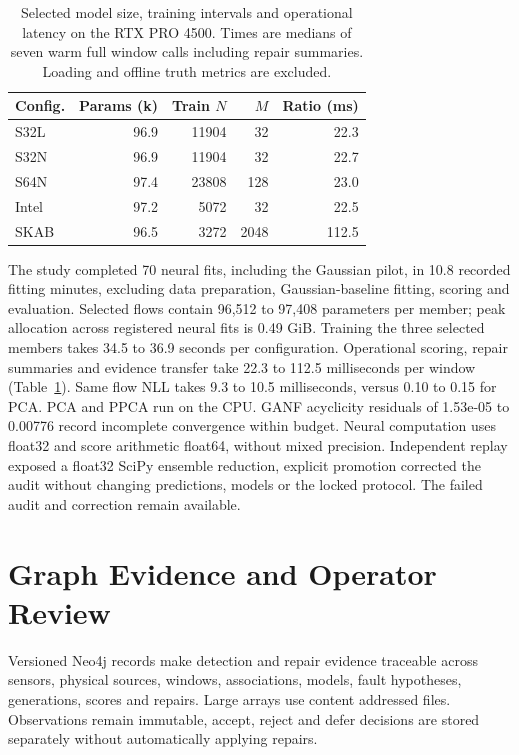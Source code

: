 \documentclass[conference]{IEEEtran}
\newcommand{\1}{\mathbf{1}}
\begin{document}
\begin{table}[t]
\centering
\caption{Selected model size, training intervals and operational latency on the RTX PRO 4500. Times are medians of seven warm full window calls including repair summaries. Loading and offline truth metrics are excluded.}
\label{tab:runtime}
\small
\begin{tabular}{lrrrr}
\toprule
Config. & Params (k) & Train $N$ & $M$ & Ratio (ms) \\
\midrule
S32L & 96.9 & 11904 & 32 & 22.3 \\
S32N & 96.9 & 11904 & 32 & 22.7 \\
S64N & 97.4 & 23808 & 128 & 23.0 \\
Intel & 97.2 & 5072 & 32 & 22.5 \\
SKAB & 96.5 & 3272 & 2048 & 112.5 \\
\bottomrule
\end{tabular}
\end{table}
The study completed 70 neural fits, including the Gaussian pilot, in 10.8 recorded fitting minutes, excluding data preparation, Gaussian-baseline fitting, scoring and evaluation. Selected flows contain 96,512 to 97,408 parameters per member; peak allocation across registered neural fits is 0.49 GiB. Training the three selected members takes 34.5 to 36.9 seconds per configuration. Operational scoring, repair summaries and evidence transfer take 22.3 to 112.5 milliseconds per window (Table~\ref{tab:runtime}). Same flow NLL takes 9.3 to 10.5 milliseconds, versus 0.10 to 0.15 for PCA. PCA and PPCA run on the CPU. GANF acyclicity residuals of 1.53e-05 to 0.00776 record incomplete convergence within budget. Neural computation uses float32 and score arithmetic float64, without mixed precision. Independent replay exposed a float32 SciPy ensemble reduction, explicit promotion corrected the audit without changing predictions, models or the locked protocol. The failed audit and correction remain available.



\section{Graph Evidence and Operator Review}
Versioned Neo4j records make detection and repair evidence traceable across sensors, physical sources, windows, associations, models, fault hypotheses, generations, scores and repairs. Large arrays use content addressed files. Observations remain immutable, accept, reject and defer decisions are stored separately without automatically applying repairs.
\end{document}
